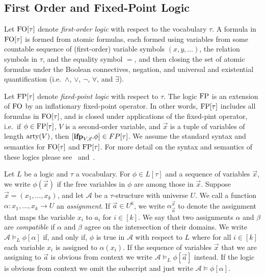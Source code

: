 \documentclass[../paper.tex]{subfiles}
\begin{document}
\subsection{First Order and Fixed-Point Logic}
Let $\text{\upshape FO}[\tau]$ denote \emph{first-order logic} with respect to the vocabulary
$\tau$. A formula in $\text{\upshape FO}[\tau]$ is formed from atomic formulas, each formed
using variables from some countable sequence of (first-order) variable symbols
$(x, y, \ldots)$, the relation symbols in $\tau$, and the equality symbol $=$,
and then closing the set of atomic formulas under the Boolean connectives,
negation, and universal and existential quantification (i.e.\ $\land$, $\lor$,
$\neg$, $\forall$, and $\exists$).

Let $\text{\upshape FP}[\tau]$ denote \emph{fixed-point logic} with respect to $\tau$. The
logic $\text{\upshape FP}$ is an extension of $\text{\upshape FO}$ by an inflationary fixed-point operator. In
other words, $\text{\upshape FP}[\tau]$ includes all formulas in $\text{\upshape FO}[\tau]$, and is closed
under applications of the fixed-pint operator, i.e.\ if $\phi \in \text{\upshape FP}[\tau]$, $V$
is a second-order variable, and $\vec{x}$ is a tuple of variables of length
$\mathrm{arty}(V)$, then $[\text{\textbf{ifp}}_{V, \vec{x}}. \phi] \in FP[\tau]$. We assume the
standard syntax and semantics for $\text{\upshape FO}[\tau]$ and $\text{\upshape FP}[\tau]$. For more detail
on the syntax and semantics of these logics please
see~\cite{grohe2017descriptive} and~\cite{GradelP15a}.

Let $L$ be a logic and $\tau$ a vocabulary. For $\phi \in L[\tau]$ and a
sequence of variables $\vec{x}$, we write $\phi(\vec{x})$ if the free variables
in $\phi$ are among those in $\vec{x}$. Suppose $\vec{x} = (x_1, \ldots , x_k)$,
and let $\mathcal{A}$ be a $\tau$-structure with universe $U$. We call a
function $\alpha : {x_1, \ldots, x_k} \rightarrow U$ an \emph{assignment}. If
$\vec{a}\in U^k$, we write $\alpha^{\vec{x}}_{\vec{a}}$ to denote the assignment
that maps the variable $x_i$ to $a_i$ for $i \in [k]$. We say that two
assignments $\alpha$ and $\beta$ are \emph{compatible} if $\alpha$ and $\beta$
agree on the intersection of their domains.  We write $\mathcal{A} \models_L
\phi[\alpha]$ if, and only if, $\phi$ is true in $\mathcal{A}$ with respect to
$L$ where for all $i \in [k]$ each variable $x_i$ is assigned to $\alpha(x_i)$.
If the sequence of variables $\vec{x}$ that we are assigning to $\vec{a}$ is
obvious from context we write $\mathcal{A} \models_L \phi[\vec{a}]$ instead. If
the logic is obvious from context we omit the subscript and just write
$\mathcal{A} \models \phi[\alpha]$.
\end{document}
